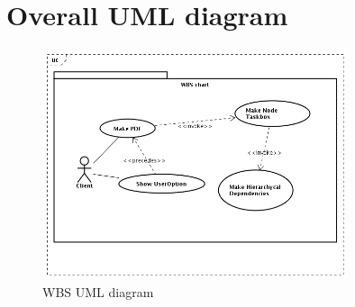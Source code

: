 \documentclass[a4paper, 12pt]{report}
\begin{document}
\section*{Overall UML diagram}
\begin{figure}[h!] \centering
\includegraphics[width=0.8\textwidth]{WBS/WBSChart.png}
\caption{WBS UML diagram}
\label{fig:WBSdiagram}
\end{figure}



\end{document}
